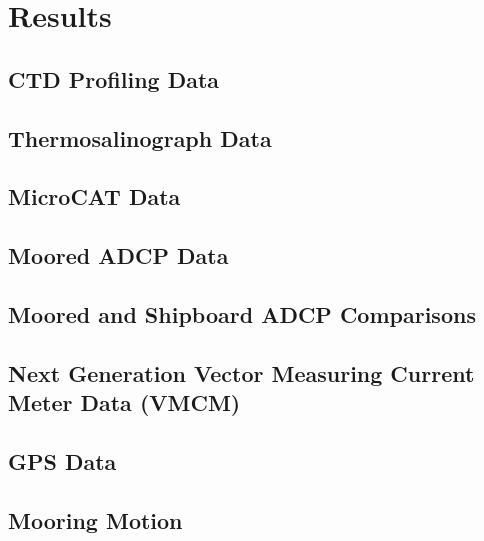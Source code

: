 \section{Results}

\subsection{CTD Profiling Data}
\subsection{Thermosalinograph Data}
\subsection{MicroCAT Data}
\subsection{Moored ADCP Data}
\subsection{Moored and Shipboard ADCP Comparisons}
\subsection{Next Generation Vector Measuring Current Meter Data (VMCM)}
\subsection{GPS Data}
\subsection{Mooring Motion}

